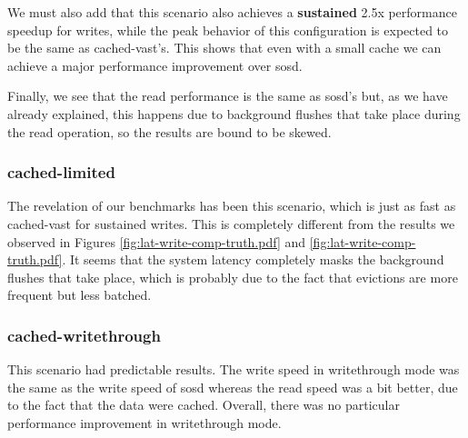 We must also add that this scenario also achieves a \textbf{sustained} 2.5x 
performance speedup for  writes, while the peak behavior of this configuration 
is expected to be the same as cached-vast's. This shows that even with a small 
cache we can achieve a major performance improvement over sosd. 

Finally, we see that the read performance is the same as sosd's but, as we have 
already explained, this happens due to background flushes that take place 
during the read operation, so the results are bound to be skewed.

\subsubsection{cached-limited}

The revelation of our benchmarks has been this scenario, which is just as fast
as cached-vast for sustained writes. This is completely different from the 
results we observed in Figures \ref{fig:lat-write-comp-truth.pdf} and 
\ref{fig:lat-write-comp-truth.pdf}. It seems that the system latency completely 
masks the background flushes that take place, which is  probably due to the 
fact that evictions are more frequent but less batched.

\subsubsection{cached-writethrough}

This scenario had predictable results. The write speed in writethrough mode was 
the same as the write speed of sosd whereas the read speed was a bit better, 
due to the fact that the data were cached. Overall, there was no particular 
performance improvement in writethrough mode.

